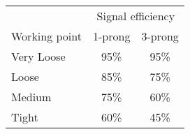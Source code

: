 \begin{tabular}{lcc}
  \toprule
  & \multicolumn{2}{c}{Signal efficiency} \\
  Working point & 1-prong & 3-prong \\
  \midrule
  Very Loose & 95\% & 95\% \\
  Loose & 85\% & 75\% \\
  Medium & 75\% & 60\% \\
  Tight & 60\% & 45\% \\
  \bottomrule
\end{tabular}

